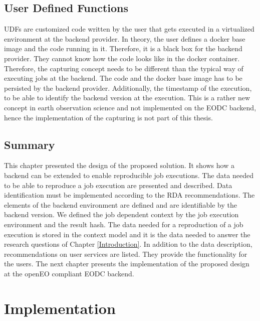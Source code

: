 \documentclass[draft,final]{vutinfth} %
\newcommand{\bgoesswein}[1]{{\color{blue}#1}}
\begin{document}
\section{User Defined Functions}\label{Design:User Defined Functions}
UDFs are customized code written by the user that gets executed in a virtualized environment at the backend provider. In theory, the user defines a docker base image and the code running in it. Therefore, it is a black box for the backend provider. They \bgoesswein{cannot} know how the code looks like in the docker container. Therefore, the capturing concept needs to be different than the typical way of executing jobs at the backend. The code and the docker base image has to be persisted by the backend provider. Additionally, the timestamp of the execution, to be able to identify the backend version at the execution. This is a rather new concept in earth observation science and not implemented on the EODC backend, hence the implementation of the capturing is not part of this thesis.

\section{Summary}
This chapter presented the design of the proposed solution. It shows how a backend can be extended to enable reproducible job executions. The data needed to be able to reproduce a job execution are presented and described. Data identification must be implemented according to the RDA recommendations. The elements of the backend environment are defined and are identifiable by the backend version. We defined the job dependent context by the job execution environment and the result hash. The data needed for a reproduction of a job execution is stored in the context model and it is the data needed to answer the research questions of Chapter \ref{Introduction}. In addition to the data description, recommendations on user services are listed. They provide the functionality for the users. The next chapter presents the implementation of the proposed design at the openEO compliant EODC backend.    

\chapter{Implementation}\label{Implementation}
\end{document}
